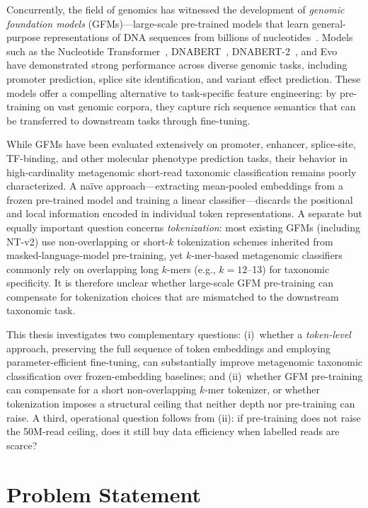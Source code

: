 Concurrently, the field of genomics has witnessed the development of \emph{genomic foundation models} (GFMs)---large-scale pre-trained models that learn general-purpose representations of DNA sequences from billions of nucleotides~\cite{DallaTorre2023}. 
Models such as the Nucleotide Transformer~\cite{DallaTorre2023}, DNABERT~\cite{Ji2021}, DNABERT-2~\cite{Zhou2024dnabert2}, and Evo~\cite{Nguyen2024} have demonstrated strong performance across diverse genomic tasks, including promoter prediction, splice site identification, and variant effect prediction. 
These models offer a compelling alternative to task-specific feature engineering: by pre-training on vast genomic corpora, they capture rich sequence semantics that can be transferred to downstream tasks through fine-tuning.

While GFMs have been evaluated extensively on promoter, enhancer, splice-site, TF-binding, and other molecular phenotype prediction tasks, their behavior in high-cardinality metagenomic short-read taxonomic classification remains poorly characterized.
A na\"ive approach---extracting mean-pooled embeddings from a frozen pre-trained model and training a linear classifier---discards the positional and local information encoded in individual token representations.
A separate but equally important question concerns \emph{tokenization}: most existing GFMs (including NT-v2) use non-overlapping or short-$k$ tokenization schemes inherited from masked-language-model pre-training, yet $k$-mer-based metagenomic classifiers commonly rely on overlapping long $k$-mers (e.g., $k = 12$--13) for taxonomic specificity.
It is therefore unclear whether large-scale GFM pre-training can compensate for tokenization choices that are mismatched to the downstream taxonomic task.

This thesis investigates two complementary questions: (i)~whether a \emph{token-level} approach, preserving the full sequence of token embeddings and employing parameter-efficient fine-tuning, can substantially improve metagenomic taxonomic classification over frozen-embedding baselines; and (ii)~whether GFM pre-training can compensate for a short non-overlapping $k$-mer tokenizer, or whether tokenization imposes a structural ceiling that neither depth nor pre-training can raise. A third, operational question follows from (ii): if pre-training does not raise the 50M-read ceiling, does it still buy data efficiency when labelled reads are scarce?

\section{Problem Statement}
\label{sec:intro-problem}

